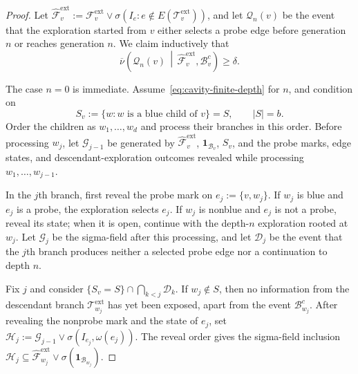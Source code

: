 \documentclass[11pt]{amsart}
\theoremstyle{plain}
\theoremstyle{definition}
\theoremstyle{remark}
\begin{document}
\begin{proof}
Let $\widehat{\mathcal F}_v^{\mathrm{ext}}:=\mathcal F_v^{\mathrm{ext}}\vee\sigma\left(I_e:e\notin E(\mathcal T_v^{\mathrm{ext}})\right)$, and let $\mathcal Q_n(v)$ be the event that the exploration started from $v$ either selects a probe edge before generation $n$ or reaches generation $n$. We claim inductively that
\begin{equation}
\label{eq:cavity-finite-depth}
    \overline\nu\left(
        \mathcal Q_n(v)
        \,\middle|\,
        \widehat{\mathcal F}_v^{\mathrm{ext}},
        \mathcal B_v^c
    \right)
    \ge\delta.
\end{equation}

The case $n=0$ is immediate. Assume~\eqref{eq:cavity-finite-depth} for $n$, and condition on
\[
    S_v:=\{w:w\text{ is a blue child of }v\}=S,
    \qquad
    |S|=b.
\]
Order the children as $w_1,\ldots,w_d$ and process their branches in this order. Before processing $w_j$, let $\mathcal G_{j-1}$ be generated by $\widehat{\mathcal F}_v^{\mathrm{ext}}$, $\mathbf 1_{\mathcal B_v}$, $S_v$, and the probe marks, edge states, and descendant-exploration outcomes revealed while processing $w_1,\ldots,w_{j-1}$. 

In the $j$th branch, first reveal the probe mark on $e_j:=\{v,w_j\}$. If $w_j$ is blue and $e_j$ is a probe, the exploration selects $e_j$. If $w_j$ is nonblue and $e_j$ is not a probe, reveal its state; when it is open, continue with the depth-$n$ exploration rooted at $w_j$. Let $\mathcal G_j$ be the sigma-field after this processing, and let $\mathcal D_j$ be the event that the $j$th branch produces neither a selected probe edge nor a continuation to depth $n$.

Fix $j$ and consider $\{S_v=S\}\cap\bigcap_{k<j}\mathcal D_k$. If $w_j\notin S$, then no information from the descendant branch $\mathcal T_{w_j}^{\mathrm{ext}}$ has yet been exposed, apart from the event $\mathcal B_{w_j}^c$. After revealing the nonprobe mark and the state of $e_j$, set $\mathcal H_j:=\mathcal G_{j-1}\vee\sigma(I_{e_j},\omega(e_j))$. The reveal order gives the sigma-field inclusion $\mathcal H_j\subseteq\widehat{\mathcal F}_{w_j}^{\mathrm{ext}}\vee\sigma(\mathbf 1_{\mathcal B_{w_j}})$.


\end{proof}
\end{document}
